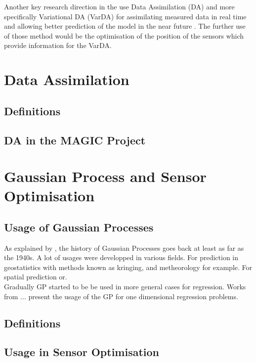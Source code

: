 \documentclass[12pt,twoside]{report}
\begin{document}
Another key research direction in the use Data Assimilation (DA) and more specifically Variational DA (VarDA) for assimilating measured data in real time and allowing better prediction of the model in the near future \citep{arcucci_effective_2018}. The further use of those method would be the optimisation of the position of the sensors which provide information for the VarDA.

\section{Data Assimilation}
\subsection{Definitions}

\subsection{DA in the MAGIC Project}

\section{Gaussian Process and Sensor Optimisation}

\subsection{Usage of Gaussian Processes}

As explained by \cite{rasmussen_gaussian_2006}, the history of Gaussian Processes \cite{rasmussen_gaussian_2006} goes back at least as far as the 1940s. A lot of usages were developped in various fields. For prediction in geostatistics with methods known as kringing, and metheorology for example. For spatial prediction  or. \\

Gradually GP started to be be used in more general cases for regression. Works from ...  present the usage of the GP for one dimensional regression problems. 


\subsection{Definitions}

\subsection{Usage in Sensor Optimisation}
\end{document}
